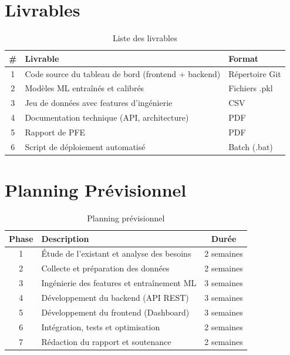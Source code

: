 \documentclass[a4paper,12pt]{report}
\begin{document}
\chapter{Livrables}

\begin{table}[h!]
\centering
\renewcommand{\arraystretch}{1.4}
\begin{tabularx}{\textwidth}{|c|X|l|}
\hline
\rowcolor{bpmblue!10}
\textbf{\#} & \textbf{Livrable} & \textbf{Format} \\
\hline
1 & Code source du tableau de bord (frontend + backend) & Répertoire Git \\
\hline
2 & Modèles ML entraînés et calibrés & Fichiers .pkl \\
\hline
3 & Jeu de données avec features d'ingénierie & CSV \\
\hline
4 & Documentation technique (API, architecture) & PDF \\
\hline
5 & Rapport de PFE & PDF \\
\hline
6 & Script de déploiement automatisé & Batch (.bat) \\
\hline
\end{tabularx}
\caption{Liste des livrables}
\end{table}

\chapter{Planning Prévisionnel}

\begin{table}[h!]
\centering
\renewcommand{\arraystretch}{1.3}
\begin{tabularx}{\textwidth}{|c|X|c|}
\hline
\rowcolor{bpmblue!10}
\textbf{Phase} & \textbf{Description} & \textbf{Durée} \\
\hline
1 & Étude de l'existant et analyse des besoins & 2 semaines \\
\hline
2 & Collecte et préparation des données & 2 semaines \\
\hline
3 & Ingénierie des features et entraînement ML & 3 semaines \\
\hline
4 & Développement du backend (API REST) & 3 semaines \\
\hline
5 & Développement du frontend (Dashboard) & 3 semaines \\
\hline
6 & Intégration, tests et optimisation & 2 semaines \\
\hline
7 & Rédaction du rapport et soutenance & 2 semaines \\
\hline
\end{tabularx}
\caption{Planning prévisionnel}
\end{table}
\end{document}
